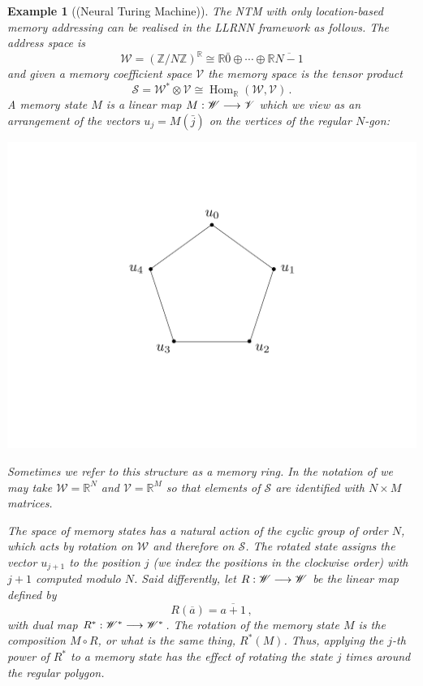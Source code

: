 \documentclass[english,letter paper,12pt,leqno]{article}
\theoremstyle{example}
\newtheorem{example}[theorem]{Example}
\numberwithin{equation}{section}
\def\Hom{\operatorname{Hom}}
\begin{document}
\begin{example}[(Neural Turing Machine)]\label{example:ntm} The NTM with only location-based memory addressing can be realised in the LLRNN framework as follows. The \emph{address space} is
\[
\mathscr{W} = (\mathbb{Z}/N\mathbb{Z})^{\mathbb{R}} \cong \mathbb{R} \bar{0} \oplus \cdots \oplus \mathbb{R} \overline{N-1}
\]
and given a \emph{memory coefficient space} $\mathscr{V}$ the \emph{memory space} is the tensor product
\[
\mathscr{S} = \mathscr{W}^* \otimes \mathscr{V} \cong \Hom_{\mathbb{R}}(\mathscr{W}, \mathscr{V})\,.
\]
A memory state $M$ is a linear map $M: \mathscr{W} \longrightarrow \mathscr{V}$ which we view as an arrangement of the vectors $u_j = M(\bar{j})$ on the vertices of the regular $N$-gon:
\begin{center}
\includegraphics[scale=0.3]{dia1}
\end{center}
Sometimes we refer to this structure as a \emph{memory ring}. In the notation of \cite{ntm} we may take $\mathscr{W} = \mathbb{R}^N$ and $\mathscr{V} = \mathbb{R}^M$ so that elements of $\mathscr{S}$ are identified with $N \times M$ matrices. 

The space of memory states has a natural action of the cyclic group of order $N$, which acts by rotation on $\mathscr{W}$ and therefore on $\mathscr{S}$. The rotated state assigns the vector $u_{j+1}$ to the position $j$ (we index the positions in the clockwise order) with $j + 1$ computed modulo $N$. Said differently, let $R: \mathscr{W} \longrightarrow \mathscr{W}$ be the linear map defined by
\[
R( \overline{a} ) = \overline{a+1}\,,
\]
with dual map $R^*: \mathscr{W}^* \longrightarrow \mathscr{W}^*$. The rotation of the memory state $M$ is the composition $M \circ R$, or what is the same thing, $R^*( M )$. Thus, applying the $j$-th power of $R^*$ to a memory state has the effect of rotating the state $j$ times around the regular polygon.


\end{example}
\end{document}
